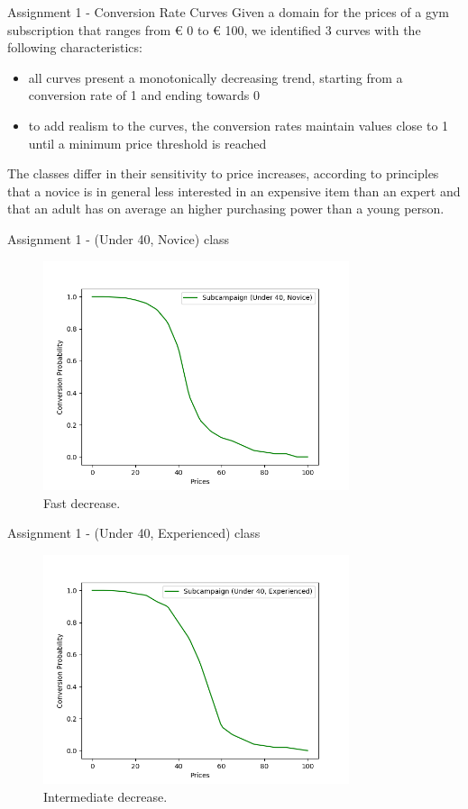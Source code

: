 \documentclass[11pt]{beamer}
\begin{document}
\begin{frame}{Assignment 1 - Conversion Rate Curves}
Given a domain for the prices of a gym subscription that ranges from € 0 to € 100, we identified 3 curves with the following characteristics:
\begin{itemize}
\item all curves present a monotonically decreasing trend, starting from a conversion rate of 1 and ending towards 0
\item to add realism to the curves, the conversion rates maintain values close to 1 until a minimum price threshold is reached  
\end{itemize}
The classes differ in their sensitivity to price increases, according to principles that a novice is in general less interested in an expensive item than an expert and that an adult has on average an higher purchasing power than a young person.

\end{frame}

\begin{frame}{Assignment 1 - (Under 40, Novice) class}
\begin{figure}[hbtp]
\centering
\includegraphics[width=0.8\textwidth]{images/demand_curve_2.png}
\caption{Fast decrease.}
\end{figure}
\end{frame}

\begin{frame}{Assignment 1 - (Under 40, Experienced) class}
\begin{figure}[hbtp]
\centering
\includegraphics[width=0.8\textwidth]{images/demand_curve_3.png}
\caption{Intermediate decrease.}
\end{figure}
\end{frame}
\end{document}
